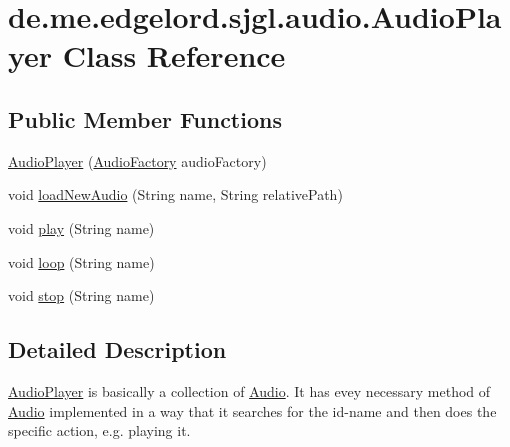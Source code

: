 \hypertarget{classde_1_1me_1_1edgelord_1_1sjgl_1_1audio_1_1_audio_player}{}\section{de.\+me.\+edgelord.\+sjgl.\+audio.\+Audio\+Player Class Reference}
\label{classde_1_1me_1_1edgelord_1_1sjgl_1_1audio_1_1_audio_player}
\subsection*{Public Member Functions}
\begin{DoxyCompactItemize}
\item 
\mbox{\hyperlink{classde_1_1me_1_1edgelord_1_1sjgl_1_1audio_1_1_audio_player_aa2ce9d41080a96a25e09f9b0830e7b04}{Audio\+Player}} (\mbox{\hyperlink{classde_1_1me_1_1edgelord_1_1sjgl_1_1factory_1_1_audio_factory}{Audio\+Factory}} audio\+Factory)
\item 
void \mbox{\hyperlink{classde_1_1me_1_1edgelord_1_1sjgl_1_1audio_1_1_audio_player_a3fa42a34769a40aaf94c16e1589f7b09}{load\+New\+Audio}} (String name, String relative\+Path)
\item 
void \mbox{\hyperlink{classde_1_1me_1_1edgelord_1_1sjgl_1_1audio_1_1_audio_player_aecce0a524758259586949e7fb0c477d6}{play}} (String name)
\item 
void \mbox{\hyperlink{classde_1_1me_1_1edgelord_1_1sjgl_1_1audio_1_1_audio_player_a4773c3bc2054fcb5f7892ebf330c68b8}{loop}} (String name)
\item 
void \mbox{\hyperlink{classde_1_1me_1_1edgelord_1_1sjgl_1_1audio_1_1_audio_player_a52bd650d815c823dc0a5e99b4aeba927}{stop}} (String name)
\end{DoxyCompactItemize}


\subsection{Detailed Description}
{\ttfamily \mbox{\hyperlink{classde_1_1me_1_1edgelord_1_1sjgl_1_1audio_1_1_audio_player}{Audio\+Player}}} is basically a collection of {\ttfamily \mbox{\hyperlink{classde_1_1me_1_1edgelord_1_1sjgl_1_1audio_1_1_audio}{Audio}}}. It has evey necessary method of {\ttfamily \mbox{\hyperlink{classde_1_1me_1_1edgelord_1_1sjgl_1_1audio_1_1_audio}{Audio}}} implemented in a way that it searches for the id-\/name and then does the specific action, e.\+g. playing it. 

